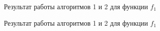 \documentclass[a4paper, 12pt]{article}
\begin{document}
  \begin{figure}[h]
    \begin{minipage}[h]{\linewidth}
    \end{minipage}
    \vfill
    \begin{minipage}[h]{\linewidth}
    \end{minipage}
    \caption{Результат работы алгоритмов 1 и 2 для функции $f_1$}
    \label{ris:image1}
    \end{figure}

    \begin{figure}[h]
      \begin{minipage}[h]{\linewidth}
      \end{minipage}
      \vfill
      \begin{minipage}[h]{\linewidth}
      \end{minipage}
      \caption{Результат работы алгоритмов 1 и 2 для функции $f_1$}
      \label{ris:image1}
      \end{figure}
\end{document}
